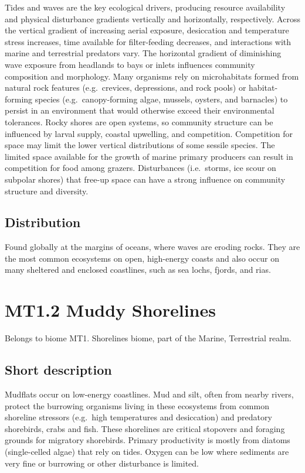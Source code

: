 \documentclass[
  letterpaper,
  DIV=11,
  numbers=noendperiod]{scrartcl}
\begin{document}
Tides and waves are the key ecological drivers, producing resource
availability and physical disturbance gradients vertically and
horizontally, respectively. Across the vertical gradient of increasing
aerial exposure, desiccation and temperature stress increases, time
available for filter-feeding decreases, and interactions with marine and
terrestrial predators vary. The horizontal gradient of diminishing wave
exposure from headlands to bays or inlets influences community
composition and morphology. Many organisms rely on microhabitats formed
from natural rock features (e.g.~crevices, depressions, and rock pools)
or habitat-forming species (e.g.~canopy-forming algae, mussels, oysters,
and barnacles) to persist in an environment that would otherwise exceed
their environmental tolerances. Rocky shores are open systems, so
community structure can be influenced by larval supply, coastal
upwelling, and competition. Competition for space may limit the lower
vertical distributions of some sessile species. The limited space
available for the growth of marine primary producers can result in
competition for food among grazers. Disturbances (i.e.~storms, ice scour
on subpolar shores) that free-up space can have a strong influence on
community structure and diversity.

\subsection{Distribution}\label{distribution-52}

Found globally at the margins of oceans, where waves are eroding rocks.
They are the most common ecosystems on open, high-energy coasts and also
occur on many sheltered and enclosed coastlines, such as sea lochs,
fjords, and rias.

\section{MT1.2 Muddy Shorelines}\label{mt1.2-muddy-shorelines}

Belongs to biome MT1. Shorelines biome, part of the Marine, Terrestrial
realm.

\subsection{Short description}\label{short-description-53}

Mudflats occur on low-energy coastlines. Mud and silt, often from nearby
rivers, protect the burrowing organisms living in these ecosystems from
common shoreline stressors (e.g.~high temperatures and desiccation) and
predatory shorebirds, crabs and fish. These shorelines are critical
stopovers and foraging grounds for migratory shorebirds. Primary
productivity is mostly from diatoms (single-celled algae) that rely on
tides. Oxygen can be low where sediments are very fine or burrowing or
other disturbance is limited.
\end{document}
